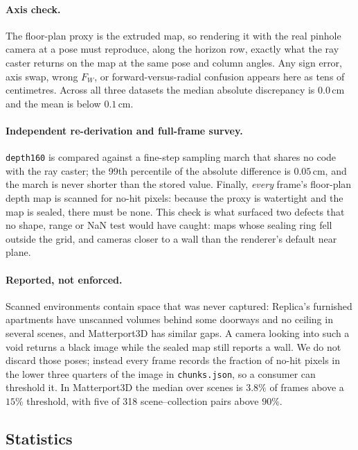 \paragraph{Axis check.}
The floor-plan proxy is the extruded map, so rendering it with the real pinhole
camera at a pose must reproduce, along the horizon row, exactly what the ray caster
returns on the map at the same pose and column angles. Any sign error, axis swap,
wrong $F_W$, or forward-versus-radial confusion appears here as tens of
centimetres. Across all three datasets the median absolute discrepancy is
$0.0\,\mathrm{cm}$ and the mean is below $0.1\,\mathrm{cm}$.

\paragraph{Independent re-derivation and full-frame survey.}
\texttt{depth160} is compared against a fine-step sampling march that shares no
code with the ray caster; the 99th percentile of the absolute difference is
$0.05\,\mathrm{cm}$, and the march is never shorter than the stored value. Finally,
\emph{every} frame's floor-plan depth map is scanned for no-hit pixels: because the
proxy is watertight and the map is sealed, there must be none. This check is what
surfaced two defects that no shape, range or NaN test would have caught: maps whose
sealing ring fell outside the grid, and cameras closer to a wall than the
renderer's default near plane.

\paragraph{Reported, not enforced.}
Scanned environments contain space that was never captured: Replica's furnished
apartments have unscanned volumes behind some doorways and no ceiling in several
scenes, and Matterport3D has similar gaps. A camera looking into such a void
returns a black image while the sealed map still reports a wall. We do not discard
those poses; instead every frame records the fraction of no-hit pixels in the lower
three quarters of the image in \texttt{chunks.json}, so a consumer can threshold it.
In Matterport3D the median over scenes is $3.8\%$ of frames above a $15\%$
threshold, with five of 318 scene--collection pairs above $90\%$.

\subsection{Statistics}
\label{sec:supp-stats}

